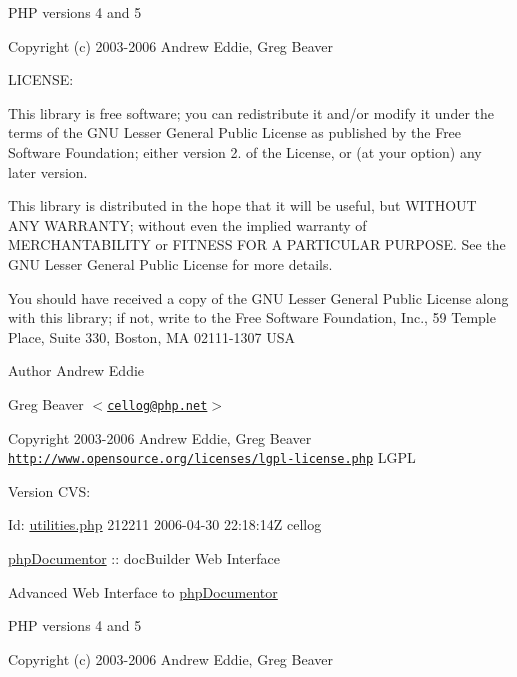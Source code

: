 \-P\-H\-P versions 4 and 5

\-Copyright (c) 2003-\/2006 \-Andrew \-Eddie, \-Greg \-Beaver

\-L\-I\-C\-E\-N\-S\-E\-:

\-This library is free software; you can redistribute it and/or modify it under the terms of the \-G\-N\-U \-Lesser \-General \-Public \-License as published by the \-Free \-Software \-Foundation; either version 2. of the \-License, or (at your option) any later version.

\-This library is distributed in the hope that it will be useful, but \-W\-I\-T\-H\-O\-U\-T \-A\-N\-Y \-W\-A\-R\-R\-A\-N\-T\-Y; without even the implied warranty of \-M\-E\-R\-C\-H\-A\-N\-T\-A\-B\-I\-L\-I\-T\-Y or \-F\-I\-T\-N\-E\-S\-S \-F\-O\-R \-A \-P\-A\-R\-T\-I\-C\-U\-L\-A\-R \-P\-U\-R\-P\-O\-S\-E. \-See the \-G\-N\-U \-Lesser \-General \-Public \-License for more details.

\-You should have received a copy of the \-G\-N\-U \-Lesser \-General \-Public \-License along with this library; if not, write to the \-Free \-Software \-Foundation, \-Inc., 59 \-Temple \-Place, \-Suite 330, \-Boston, \-M\-A 02111-\/1307 \-U\-S\-A

\begin{DoxyAuthor}{\-Author}
\-Andrew \-Eddie 

\-Greg \-Beaver $<$\href{mailto:cellog@php.net}{\tt cellog@php.\-net}$>$ 
\end{DoxyAuthor}
\begin{DoxyCopyright}{\-Copyright}
2003-\/2006 \-Andrew \-Eddie, \-Greg \-Beaver  \href{http://www.opensource.org/licenses/lgpl-license.php}{\tt http\-://www.\-opensource.\-org/licenses/lgpl-\/license.\-php} \-L\-G\-P\-L 
\end{DoxyCopyright}
\begin{DoxyVersion}{\-Version}
\-C\-V\-S\-: 
\end{DoxyVersion}
\begin{DoxyParagraph}{\-Id\-:}
\hyperlink{utilities_8php}{utilities.\-php} 212211 2006-\/04-\/30 22\-:18\-:14\-Z cellog 
\end{DoxyParagraph}


\hyperlink{namespacephp_documentor}{php\-Documentor} \-:\-: doc\-Builder \-Web \-Interface

\-Advanced \-Web \-Interface to \hyperlink{namespacephp_documentor}{php\-Documentor}

\-P\-H\-P versions 4 and 5

\-Copyright (c) 2003-\/2006 \-Andrew \-Eddie, \-Greg \-Beaver

